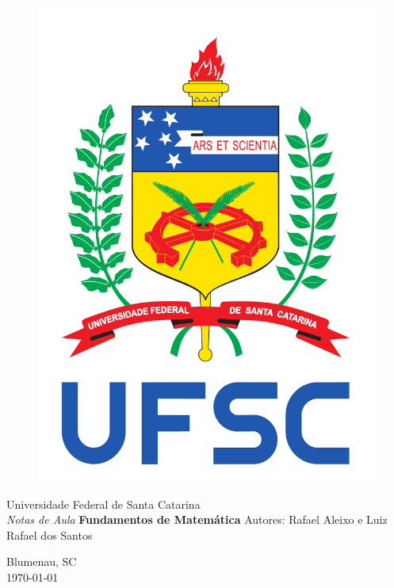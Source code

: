 \thispagestyle{empty}
\begin{figure}[!h]
\begin{minipage}{0.12\linewidth}
\vspace{-1cm} \includegraphics[width=\textwidth]{brasao_ufsc_color}
\end{minipage}\hspace{.5cm}
\end{figure}
\begin{center}
{\Huge Universidade Federal de Santa Catarina} \\ \vfill
\vfill
{\Large \it Notas de Aula}
\vfill
\vfill
{\LARGE \textbf{Fundamentos de Matem\'atica}}
\vfill
\vfill
{\Large Autores: Rafael Aleixo e Luiz Rafael dos Santos}
\vfill
\vfill
\end{center}
\begin{center}
\vfill
{\large Blumenau, SC}\\
{\large \today}
\vfill
\end{center}

